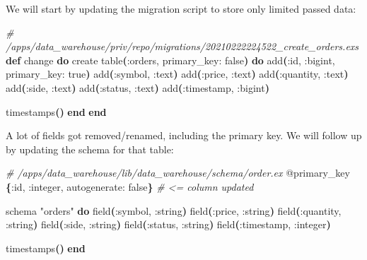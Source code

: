\documentclass[
  oneside]{book}
\newenvironment{Shaded}{\begin{snugshade}}{\end{snugshade}}
\newcommand{\CommentTok}[1]{\textcolor[rgb]{0.56,0.35,0.01}{\textit{#1}}}
\newcommand{\ConstantTok}[1]{\textcolor[rgb]{0.56,0.35,0.01}{#1}}
\newcommand{\FunctionTok}[1]{\textcolor[rgb]{0.13,0.29,0.53}{\textbf{#1}}}
\newcommand{\KeywordTok}[1]{\textcolor[rgb]{0.13,0.29,0.53}{\textbf{#1}}}
\newcommand{\NormalTok}[1]{#1}
\newcommand{\OtherTok}[1]{\textcolor[rgb]{0.56,0.35,0.01}{#1}}
\newcommand{\StringTok}[1]{\textcolor[rgb]{0.31,0.60,0.02}{#1}}
\newcommand{\VariableTok}[1]{\textcolor[rgb]{0.00,0.00,0.00}{#1}}
\begin{document}
We will start by updating the migration script to store only limited passed data:

\begin{Shaded}
\begin{Highlighting}[]
  \CommentTok{\# /apps/data\_warehouse/priv/repo/migrations/20210222224522\_create\_orders.exs}
  \KeywordTok{def}\NormalTok{ change }\KeywordTok{do}
\NormalTok{    create table}\FunctionTok{(}\VariableTok{:orders}\NormalTok{, }\VariableTok{primary\_key:} \ConstantTok{false}\FunctionTok{)} \KeywordTok{do}
\NormalTok{      add}\FunctionTok{(}\VariableTok{:id}\NormalTok{, }\VariableTok{:bigint}\NormalTok{, }\VariableTok{primary\_key:} \ConstantTok{true}\FunctionTok{)}
\NormalTok{      add}\FunctionTok{(}\VariableTok{:symbol}\NormalTok{, }\VariableTok{:text}\FunctionTok{)}
\NormalTok{      add}\FunctionTok{(}\VariableTok{:price}\NormalTok{, }\VariableTok{:text}\FunctionTok{)}
\NormalTok{      add}\FunctionTok{(}\VariableTok{:quantity}\NormalTok{, }\VariableTok{:text}\FunctionTok{)}
\NormalTok{      add}\FunctionTok{(}\VariableTok{:side}\NormalTok{, }\VariableTok{:text}\FunctionTok{)}
\NormalTok{      add}\FunctionTok{(}\VariableTok{:status}\NormalTok{, }\VariableTok{:text}\FunctionTok{)}
\NormalTok{      add}\FunctionTok{(}\VariableTok{:timestamp}\NormalTok{, }\VariableTok{:bigint}\FunctionTok{)}

\NormalTok{      timestamps}\FunctionTok{()}
    \KeywordTok{end}
  \KeywordTok{end}
\end{Highlighting}
\end{Shaded}

A lot of fields got removed/renamed, including the primary key. We will follow up by updating the schema for that table:

\begin{Shaded}
\begin{Highlighting}[]
 \CommentTok{\# /apps/data\_warehouse/lib/data\_warehouse/schema/order.ex}
  \OtherTok{@primary\_key} \FunctionTok{\{}\VariableTok{:id}\NormalTok{, }\VariableTok{:integer}\NormalTok{, }\VariableTok{autogenerate:} \ConstantTok{false}\FunctionTok{\}} \CommentTok{\# \textless{}= column updated}

\NormalTok{  schema }\StringTok{"orders"} \KeywordTok{do}
\NormalTok{    field}\FunctionTok{(}\VariableTok{:symbol}\NormalTok{, }\VariableTok{:string}\FunctionTok{)}
\NormalTok{    field}\FunctionTok{(}\VariableTok{:price}\NormalTok{, }\VariableTok{:string}\FunctionTok{)}
\NormalTok{    field}\FunctionTok{(}\VariableTok{:quantity}\NormalTok{, }\VariableTok{:string}\FunctionTok{)}
\NormalTok{    field}\FunctionTok{(}\VariableTok{:side}\NormalTok{, }\VariableTok{:string}\FunctionTok{)}
\NormalTok{    field}\FunctionTok{(}\VariableTok{:status}\NormalTok{, }\VariableTok{:string}\FunctionTok{)}
\NormalTok{    field}\FunctionTok{(}\VariableTok{:timestamp}\NormalTok{, }\VariableTok{:integer}\FunctionTok{)}

\NormalTok{    timestamps}\FunctionTok{()}
  \KeywordTok{end}
\end{Highlighting}
\end{Shaded}
\end{document}
